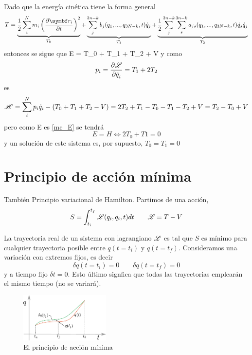 \documentclass[10pt,oneside]{CBFT_book}
\begin{document}
Dado que la energía cinética tiene la forma general
\[
	T = \underbrace{\frac{1}{2} \sum_i^N m_i \left( \dpar{\vb{r}_i}{t} \right)^2}_{T_0}  +
	\underbrace{\sum_j^{3n-k} b_j(q_1,...,q_{3N-k},t)\dot{q}_j  }_{T_1} +
	\underbrace{\frac{1}{2} \sum_j^{3n-k}\sum_s^{3n-k}  a_{js}(q_1,...,q_{3N-k},t)\dot{q}_s\dot{q}_j }_{T_2}
\]
entonces se sigue que 
\be
	E = T_0 + T_1 + T_2 + V
\label{mc_E}
\ee
y como 
\[
	p_i = \frac{\partial^{\hspace{-0.05em}} {\mathscr{L}}}{\partial {\dot{q}_i}^{\hspace{-0.05em}}} = T_1 + 2T_2 
\]
es 
\[
	\mathscr{H} = \sum_i^N p_i\dot{q}_i - (T_0 + T_1 + T_2 - V) = 2T_2 + T_1 - T_0 - T_1 - T_2 + V = T_2 - T_0 + V
\]
pero como E es \eqref{mc_E} se tendrá 
\[
	E = H \iff 2T_0 + T1 = 0
\]
y un solución de este sistema es, por supuesto, $T_0 = T_1 = 0$

\section{Principio de acción mínima}

También Principio variacional de Hamilton. Partimos de una acción,
\[
	S = \int_{t_i}^{t_f} \mathscr{L}( q_i, \dot{q}_i, t ) dt \qquad \mathscr{L} = T-V
\]

La trayectoria real de un sistema con lagrangiano $\mathscr{L}$ es tal que $S$ es mínimo para cualquier 
trayectoria posible entre $q(t=t_i)$ y $q(t=t_f)$. Consideramos una variación con extremos fijos,
es decir 
\[
	\delta q(t=t_i) = 0 \qquad \delta q(t=t_f) = 0
\]
y a tiempo fijo $\delta t = 0$. Esto último signfica que todas las trayectorias emplearán el 
mismo tiempo (no se variará).

\begin{figure}
	\begin{center}
	\includegraphics[width=0.4\textwidth]{images/fig_accion.pdf}	 
	\end{center}
	\caption{El principio de acción mínima}
\end{figure}
\end{document}
